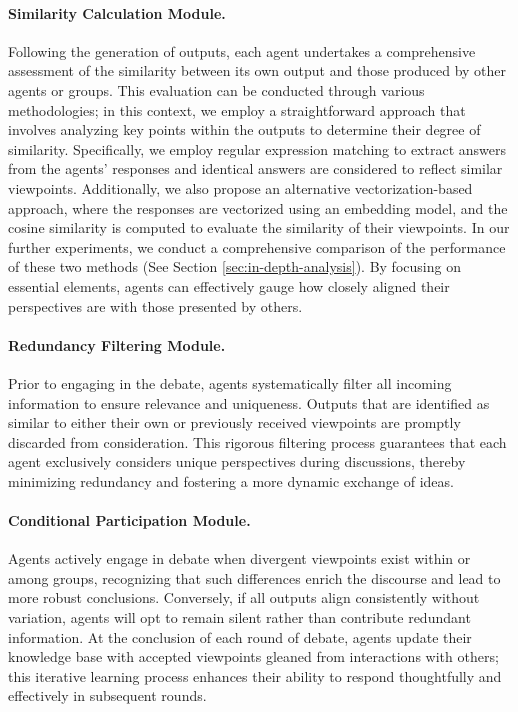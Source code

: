 \paragraph{Similarity Calculation Module.} Following the generation of outputs, each agent undertakes a comprehensive assessment of the similarity between its own output and those produced by other agents or groups. This evaluation can be conducted through various methodologies; in this context, we employ a straightforward approach that involves analyzing key points within the outputs to determine their degree of similarity. Specifically, we employ regular expression matching to extract answers from the agents' responses and identical answers are considered to reflect similar viewpoints. Additionally, we also propose an alternative vectorization-based approach, where the responses are vectorized using an embedding model, and the cosine similarity is computed to evaluate the similarity of their viewpoints. In our further experiments, we conduct a comprehensive comparison of the performance of these two methods (See Section \ref{sec:in-depth-analysis}). By focusing on essential elements, agents can effectively gauge how closely aligned their perspectives are with those presented by others.

\paragraph{Redundancy Filtering Module.} Prior to engaging in the debate, agents systematically filter all incoming information to ensure relevance and uniqueness. Outputs that are identified as similar to either their own or previously received viewpoints are promptly discarded from consideration. This rigorous filtering process guarantees that each agent exclusively considers unique perspectives during discussions, thereby minimizing redundancy and fostering a more dynamic exchange of ideas.

\paragraph{Conditional Participation Module.} Agents actively engage in debate when divergent viewpoints exist within or among groups, recognizing that such differences enrich the discourse and lead to more robust conclusions. Conversely, if all outputs align consistently without variation, agents will opt to remain silent rather than contribute redundant information. At the conclusion of each round of debate, agents update their knowledge base with accepted viewpoints gleaned from interactions with others; this iterative learning process enhances their ability to respond thoughtfully and effectively in subsequent rounds.


